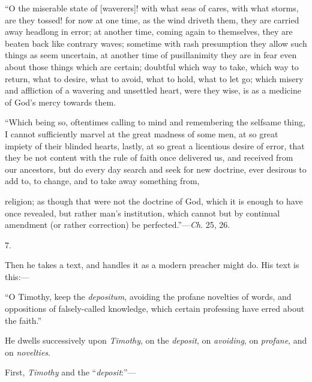 ``O the miserable state of [waverers]! with what seas of cares,
with what storms, are they tossed! for now at one time, as the wind
driveth them, they are carried away headlong in error; at another
time, coming again to themselves, they are beaten back like contrary
waves; sometime with rash presumption they allow such things as seem
uncertain, at another time of pusillanimity they are in fear even
about those things which are certain; doubtful which way to take,
which way to return, what to desire, what to avoid, what to hold, what
to let go; which misery and affliction of a wavering and unsettled
heart, were they wise, is as a medicine of God's mercy towards them.

``Which being so, oftentimes calling to mind and remembering
the selfsame thing, I cannot sufficiently marvel at the great madness
of some men, at so great impiety of their blinded hearts, lastly, at
so great a licentious desire of error, that they be not content with
the rule of faith once delivered us, and received from our ancestors,
but do every day search and seek for new doctrine, ever desirous to
add to, to change, and to take away something from,

religion; as
though that were not the doctrine of God, which it is enough to have
once revealed, but rather man's institution, which cannot but by
continual amendment (or rather correction) be perfected.''—\emph{Ch}.
25, 26.

7.

Then he takes a text, and handles it as a modern preacher might do.
His text is this:—

``O Timothy, keep the \emph{depositum}, avoiding the profane
novelties of words, and oppositions of falsely-called knowledge, which
certain professing have erred about the faith.''

He dwells successively upon \emph{Timothy}, on the \emph{deposit},
on \emph{avoiding}, on \emph{profane}, and on \emph{novelties}.

First, \emph{Timothy} and the ``\emph{deposit}:''—

